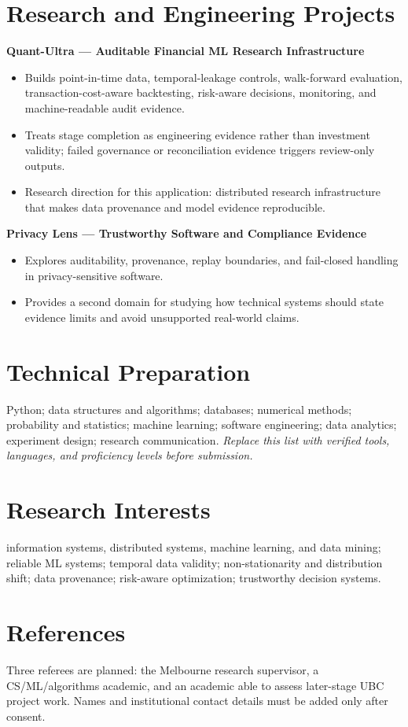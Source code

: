 \documentclass[11pt]{article}
\begin{document}
\section*{Research and Engineering Projects}
\textbf{Quant-Ultra --- Auditable Financial ML Research Infrastructure}
\begin{itemize}
\item Builds point-in-time data, temporal-leakage controls, walk-forward evaluation, transaction-cost-aware backtesting, risk-aware decisions, monitoring, and machine-readable audit evidence.
\item Treats stage completion as engineering evidence rather than investment validity; failed governance or reconciliation evidence triggers review-only outputs.
\item Research direction for this application: distributed research infrastructure that makes data provenance and model evidence reproducible.
\end{itemize}

\begin{samepage}
\textbf{Privacy Lens --- Trustworthy Software and Compliance Evidence}
\begin{itemize}
\item Explores auditability, provenance, replay boundaries, and fail-closed handling in privacy-sensitive software.
\item Provides a second domain for studying how technical systems should state evidence limits and avoid unsupported real-world claims.
\end{itemize}
\end{samepage}

\section*{Technical Preparation}
Python; data structures and algorithms; databases; numerical methods; probability and statistics; machine learning; software engineering; data analytics; experiment design; research communication. \textit{Replace this list with verified tools, languages, and proficiency levels before submission.}

\section*{Research Interests}
information systems, distributed systems, machine learning, and data mining; reliable ML systems; temporal data validity; non-stationarity and distribution shift; data provenance; risk-aware optimization; trustworthy decision systems.

\section*{References}
Three referees are planned: the Melbourne research supervisor, a CS/ML/algorithms academic, and an academic able to assess later-stage UBC project work. Names and institutional contact details must be added only after consent.
\end{document}
